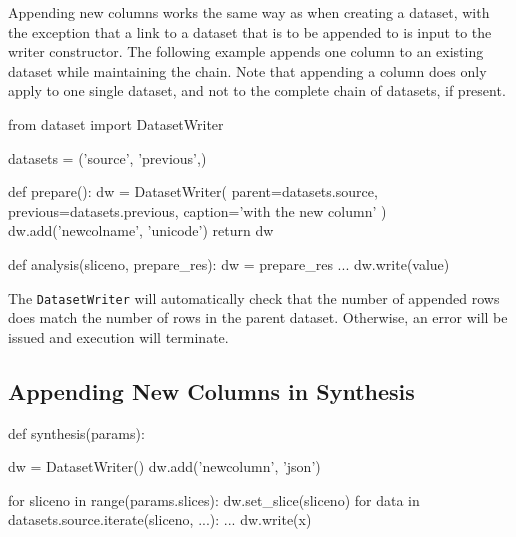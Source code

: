 Appending new columns works the same way as when creating a dataset,
with the exception that a link to a dataset that is to be appended to
is input to the writer constructor.  The following example appends one
column to an existing dataset while maintaining the chain.  Note that
appending a column does only apply to one single dataset, and not to
the complete chain of datasets, if present.
\begin{python}
from dataset import DatasetWriter

datasets = ('source', 'previous',)

def prepare():
    dw = DatasetWriter(
        parent=datasets.source,
        previous=datasets.previous,
        caption='with the new column'
    )
    dw.add('newcolname', 'unicode')
    return dw

def analysis(sliceno, prepare_res):
    dw = prepare_res
    ...
    dw.write(value)
\end{python}
The \texttt{DatasetWriter} will automatically check that the number of
appended rows does match the number of rows in the parent dataset.
Otherwise, an error will be issued and execution will terminate.


\subsection{Appending New Columns in Synthesis}


\begin{python}
def synthesis(params):

    dw = DatasetWriter()
    dw.add('newcolumn', 'json')
    
    for sliceno in range(params.slices):
        dw.set_slice(sliceno)
        for data in datasets.source.iterate(sliceno, ...):
            ...
            dw.write(x)
\end{python}

